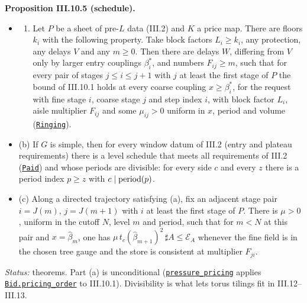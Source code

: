 \documentclass[
  letterpaper,
  11pt]{article}
\providecommand{\tightlist}{%
  \setlength{\itemsep}{0pt}\setlength{\parskip}{0pt}}
\begin{document}
\textbf{Proposition III.10.5 (schedule).}

\begin{itemize}
\tightlist
\item
  \begin{enumerate}
  \def\labelenumi{(\alph{enumi})}
  \tightlist
  \item
    Let \(P\) be a sheet of pre-\(L\) data (III.2) and \(K\) a price
    map. There are floors \(k_i\) with the following property. Take
    block factors \(L_i\ge k_i\), any protection, any delays \(V\) and
    any \(m\ge0\). Then there are delays \(W\), differing from \(V\)
    only by larger entry couplings \(\beta^*_i\), and numbers
    \(F_{ij}\ge m\), such that for every pair of stages
    \(j\le i\le j+1\) with \(j\) at least the first stage of \(P\) the
    bound of III.10.1 holds at every coarse coupling \(x\ge\beta^*_i\),
    for the request with fine stage \(i\), coarse stage \(j\) and step
    index \(i\), with block factor \(L_i\), aisle multiplier \(F_{ij}\)
    and some \(\mu_{ij}>0\) uniform in \(x\), period and volume
    (\href{https://github.com/yang-mills-group/OpenAI-YM-20261028/blob/3456e5e75cf8d4cd558955a5c7638fba2d68f464/YM/Pressure/Seeds.lean\#L161-L163}{\texttt{Ringing}}).
  \end{enumerate}
\item
  (b) If \(G\) is simple, then for every window datum of III.2 (entry
  and plateau requirements) there is a level schedule that meets all
  requirements of III.2
  (\href{https://github.com/yang-mills-group/OpenAI-YM-20261028/blob/3456e5e75cf8d4cd558955a5c7638fba2d68f464/YM/Price/Intent.lean\#L145-L162}{\texttt{Paid}})
  and whose periods are divisible: for every side \(c\) and every \(z\)
  there is a period index \(p\ge z\) with \(c\mid{\rm period}(p)\).
\item
  (c) Along a directed trajectory satisfying (a), fix an adjacent stage
  pair \(i=J(m)\), \(j=J(m+1)\) with \(i\) at least the first stage of
  \(P\). There is \(\mu>0\), uniform in the cutoff \(N\), level \(m\)
  and period, such that for \(m<N\) at this pair and \(x=\hat\beta_m\),
  one has \(\mu\,t_c(\hat\beta_{m+1})^2\,\sharp A\le\mathcal E_A\)
  whenever the fine field is in the chosen tree gauge and the store is
  consistent at multiplier \(F_{ji}\).
\end{itemize}

\emph{Status:} theorems. Part (a) is unconditional
(\href{https://github.com/yang-mills-group/OpenAI-YM-20261028/blob/3456e5e75cf8d4cd558955a5c7638fba2d68f464/YM/Next/FLUCTUATIONS/Grants.lean\#L32-L37}{\texttt{pressure\_pricing}}
applies
\href{https://github.com/yang-mills-group/OpenAI-YM-20261028/blob/3456e5e75cf8d4cd558955a5c7638fba2d68f464/YM/Bid/Energy.lean\#L173-L202}{\texttt{Bid.pricing\_order}}
to III.10.1). Divisibility is what lets torus tilings fit in
III.12--III.13.
\end{document}
